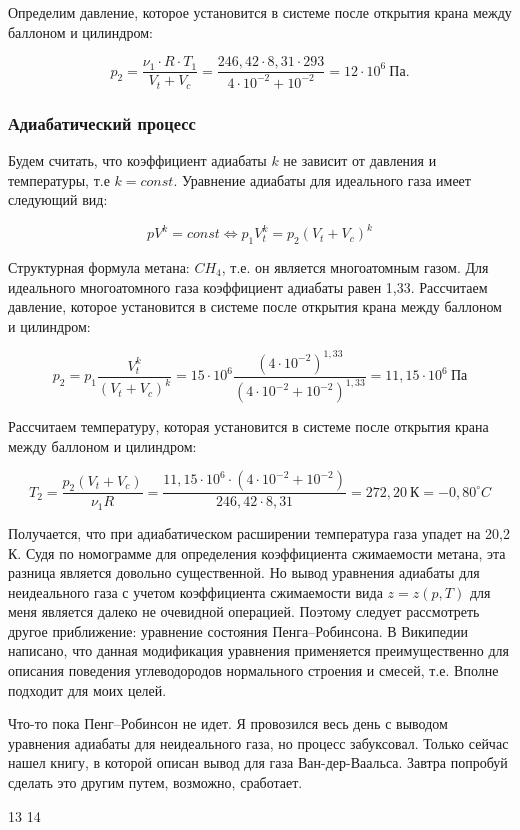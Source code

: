 \documentclass[a4paper,14pt]{article}
\theoremstyle{plain} %
\theoremstyle{definition} %
\theoremstyle{remark} %
\begin{document}
Определим давление, которое установится в системе после открытия крана между баллоном и цилиндром:

\begin{equation}
	p_2 = \frac{\nu_1 \cdot R \cdot T_1}{V_t + V_c} = \frac{246,42 \cdot 8,31 \cdot 293}{4 \cdot 10^{-2} + 10^{-2}} = 12 \cdot 10^6~\textrm{Па}.
\end{equation}

\subsubsection{Адиабатический процесс}

Будем считать, что коэффициент адиабаты $k$ не зависит от давления и температуры, т.е $k = const$. Уравнение адиабаты для идеального газа имеет следующий вид:

\begin{equation}
	p V^k = const \Leftrightarrow p_1 V_t^k = p_2 (V_t + V_c)^k
\end{equation}

Структурная формула метана: $CH_4$, т.е. он является многоатомным газом. Для идеального многоатомного газа коэффициент адиабаты равен 1,33. Рассчитаем давление, которое установится в системе после открытия крана между баллоном и цилиндром:

\begin{equation}
	p_2 = p_1 \frac{V_t^k}{(V_t + V_c)^k} = 15 \cdot 10^6 \frac{(4 \cdot 10^{-2})^{1,33}}{(4 \cdot 10^{-2} + 10^{-2})^{1,33}} = 11,15 \cdot 10^6~\textrm{Па}
\end{equation}

Рассчитаем температуру, которая установится в системе после открытия крана между баллоном и цилиндром:

\begin{equation}
	T_2 = \frac{p_2 (V_t + V_c)}{\nu_1 R} = \frac{11,15 \cdot 10^6 \cdot (4 \cdot 10^{-2} + 10^{-2})}{246,42 \cdot 8,31} = 272,20~\textrm{К} = - 0,80^\circ C
\end{equation}

Получается, что при адиабатическом расширении температура газа упадет на 20,2 К. Судя по номограмме для определения коэффициента сжимаемости метана, эта разница является довольно существенной. Но вывод уравнения адиабаты для неидеального газа с учетом коэффициента сжимаемости вида $z = z (p,T)$ для меня является далеко не очевидной операцией. Поэтому следует рассмотреть другое приближение: уравнение состояния Пенга--Робинсона. В Википедии написано, что данная модификация уравнения применяется преимущественно для описания поведения углеводородов нормального строения и смесей, т.е. Вполне подходит для моих целей.

Что-то пока Пенг--Робинсон не идет. Я провозился весь день с выводом уравнения адиабаты для неидеального газа, но процесс забуксовал. Только сейчас нашел книгу, в которой описан вывод для газа Ван-дер-Ваальса. Завтра попробуй сделать это другим путем, возможно, сработает.

\newpage

13
14
\end{document}

